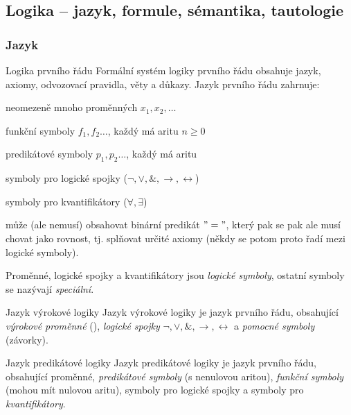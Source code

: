 \def\c#1{\mathcal{#1}}


\subsection{Logika -- jazyk, formule, sémantika, tautologie}

\subsubsection*{Jazyk}

\begin{obecne}{Logika prvního řádu}
Formální systém logiky prvního řádu obsahuje jazyk, axiomy, odvozovací pravidla, věty a důkazy. Jazyk prvního řádu zahrnuje:
\begin{pitemize}
    \item neomezeně mnoho proměnných $x_1,x_2,\dots $
    \item funkční symboly $f_1,f_2\dots $, každý má aritu  $n\geq 0$
    \item predikátové symboly $p_1,p_2\dots $, každý má aritu
    \item symboly pro logické spojky ($\neg,\vee,\&,\rightarrow,\leftrightarrow$)
    \item symboly pro kvantifikátory ($\forall,\exists$)
    \item může (ale nemusí) obsahovat binární predikát $"="$, který pak se pak ale musí chovat jako rovnost, tj. splňovat určité axiomy (někdy se potom proto řadí mezi logické symboly).
\end{pitemize}
Proměnné, logické spojky a kvantifikátory jsou \emph{logické symboly}, ostatní symboly se nazývají \emph{speciální}.
\end{obecne}

\begin{definiceN}{Jazyk výrokové logiky}
Jazyk výrokové logiky je jazyk prvního řádu, obsahující \emph{výrokové proměnné} (), \emph{logické spojky} $\neg,\vee,\&,\rightarrow,\leftrightarrow$ a \emph{pomocné symboly} (závorky).
\end{definiceN}

\begin{definiceN}{Jazyk predikátové logiky}
Jazyk predikátové logiky je jazyk prvního řádu, obsahující proměnné, \emph{predikátové symboly} (s nenulovou aritou), \emph{funkční symboly} (mohou mít nulovou aritu), symboly pro logické spojky a symboly pro \emph{kvantifikátory}.
\end{definiceN}

